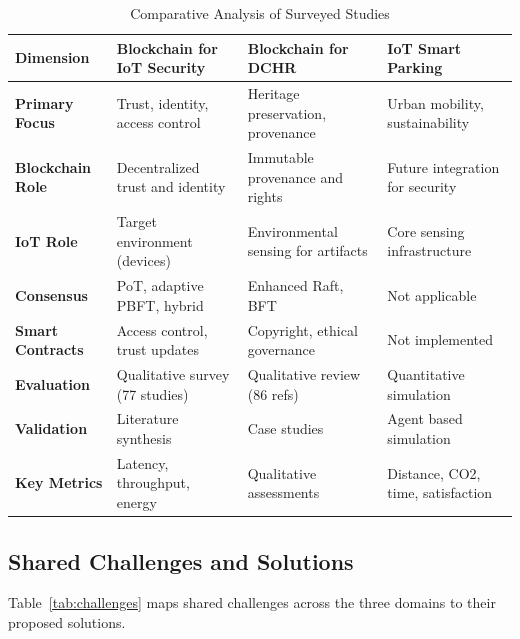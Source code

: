 \documentclass[conference]{IEEEtran}
\begin{document}
\begin{table}[htbp]
\caption{Comparative Analysis of Surveyed Studies}
\begin{center}
\begin{tabular}{p{2.5cm}p{4.5cm}p{4.5cm}p{4.5cm}}
\toprule
\textbf{Dimension} & \textbf{Blockchain for IoT Security~\cite{b1}} & \textbf{Blockchain for DCHR~\cite{b2}} & \textbf{IoT Smart Parking~\cite{b3}} \\
\midrule
\textbf{Primary Focus} & Trust, identity, access control & Heritage preservation, provenance & Urban mobility, sustainability \\
\textbf{Blockchain Role} & Decentralized trust and identity & Immutable provenance and rights & Future integration for security \\
\textbf{IoT Role} & Target environment (devices) & Environmental sensing for artifacts & Core sensing infrastructure \\
\textbf{Consensus} & PoT, adaptive PBFT, hybrid & Enhanced Raft, BFT & Not applicable \\
\textbf{Smart Contracts} & Access control, trust updates & Copyright, ethical governance & Not implemented \\
\textbf{Evaluation} & Qualitative survey (77 studies) & Qualitative review (86 refs) & Quantitative simulation \\
\textbf{Validation} & Literature synthesis & Case studies & Agent based simulation \\
\textbf{Key Metrics} & Latency, throughput, energy & Qualitative assessments & Distance, CO2, time, satisfaction \\
\bottomrule
\end{tabular}
\label{tab:comparison}
\end{center}
\end{table}

\subsection{Shared Challenges and Solutions}

Table~\ref{tab:challenges} maps shared challenges across the three domains to their proposed solutions.
\end{document}
